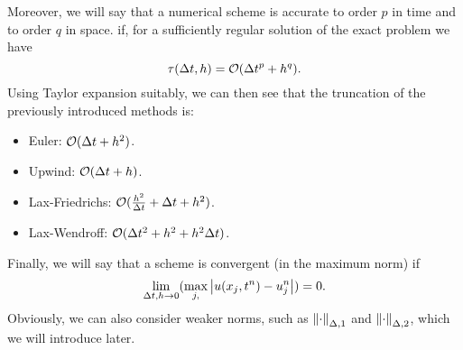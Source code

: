 Moreover, we will say that a numerical scheme is accurate to order \(p\) in time and to order \(q\) in space. if, for a sufficiently regular solution of the exact problem we have 
\[
    \tau(\Delta t, h) = \mathcal{O}(\Delta t^p + h^q).
\]
Using Taylor expansion suitably, we can then see that the truncation of the previously introduced methods is: 
\begin{itemize}
    \item Euler: \(\mathcal{O}(\Delta t + h^2)\).
    \item Upwind: \(\mathcal{O}(\Delta t + h)\).
    \item Lax-Friedrichs: \(\mathcal{O}(\frac{h^2}{\Delta t} + \Delta t + h^2)\).
    \item Lax-Wendroff: \(\mathcal{O}(\Delta t^2 + h^2 +h^2\Delta t)\).
\end{itemize}
Finally, we will say that a scheme is convergent (in the maximum norm) if 
\[
    \lim_{\Delta t, h \to 0} (\max_{j,} \abs{u(x_j, t^n) - u_j^n}) = 0.
\]
Obviously, we can also consider weaker norms, such as \(\norm{\cdot}_{\Delta,1}\) and \(\norm{\cdot}_{\Delta, 2}\), which we will introduce later.

